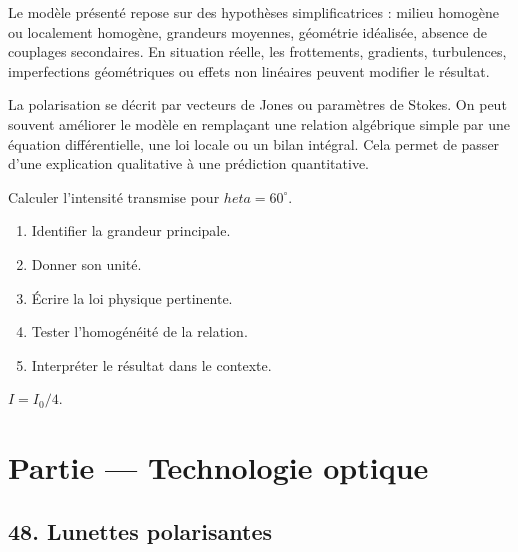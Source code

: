 \documentclass[11pt,a4paper]{article}
\begin{document}
\begin{attentionbox}
Le modèle présenté repose sur des hypothèses simplificatrices : milieu homogène ou localement homogène, grandeurs moyennes, géométrie idéalisée, absence de couplages secondaires. En situation réelle, les frottements, gradients, turbulences, imperfections géométriques ou effets non linéaires peuvent modifier le résultat.
\end{attentionbox}

\begin{approfondissementbox}
La polarisation se décrit par vecteurs de Jones ou paramètres de Stokes.
On peut souvent améliorer le modèle en remplaçant une relation algébrique simple par une équation différentielle, une loi locale ou un bilan intégral. Cela permet de passer d'une explication qualitative à une prédiction quantitative.
\end{approfondissementbox}

\begin{exercicebox}
Calculer l'intensité transmise pour $	heta=60^\circ$.
\begin{enumerate}
  \item Identifier la grandeur principale.
  \item Donner son unité.
  \item Écrire la loi physique pertinente.
  \item Tester l'homogénéité de la relation.
  \item Interpréter le résultat dans le contexte.
\end{enumerate}
\end{exercicebox}

\begin{corrigebox}[Indication]
$I=I_0/4$.
\end{corrigebox}


\section{Partie — Technologie optique}


\subsection{48. Lunettes polarisantes}
\end{document}
